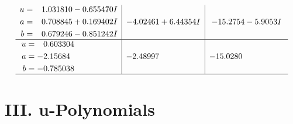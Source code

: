 \documentclass[1p]{elsarticle_modified}
\theoremstyle{definition}
\begin{document}
$$\begin{array}{c|c|c}
\begin{aligned}
u &= \phantom{-}1.031810 - 0.655470 I \\
a &= \phantom{-}0.708845 + 0.169402 I \\
b &= \phantom{-}0.679246 - 0.851242 I\end{aligned}
 & -4.02461 + 6.44354 I & -15.2754 - 5.9053 I \\ \hline\begin{aligned}
u &= \phantom{-}0.603304\phantom{ +0.000000I} \\
a &= -2.15684\phantom{ +0.000000I} \\
b &= -0.785038\phantom{ +0.000000I}\end{aligned}
 & -2.48997\phantom{ +0.000000I} & -15.0280\phantom{ +0.000000I}\\
 \hline 
 \end{array}$$\newpage
\newpage\renewcommand{\arraystretch}{1}
\centering \section*{ III. u-Polynomials}
\end{document}
